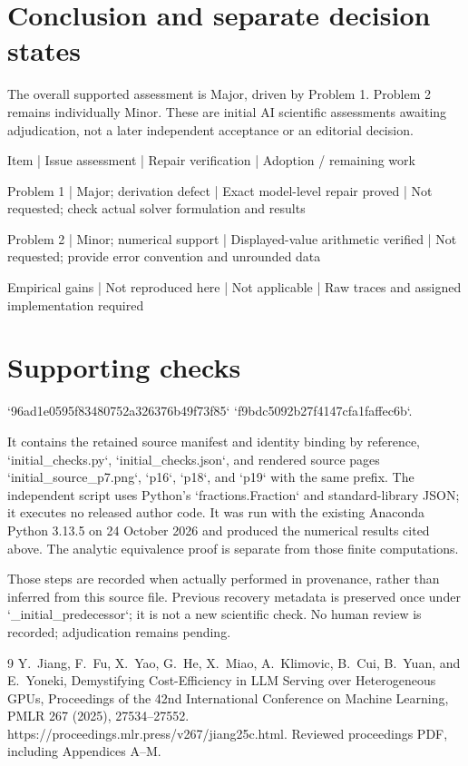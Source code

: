 \documentclass[10pt]{article}
\begin{document}
\section*{Conclusion and separate decision states}
The overall supported assessment is Major, driven by Problem 1. Problem 2 remains individually Minor. These are initial AI scientific assessments awaiting adjudication, not a later independent acceptance or an editorial decision.\par
Item | Issue assessment | Repair verification | Adoption / remaining work\par
Problem 1 | Major; derivation defect | Exact model-level repair proved | Not requested; check actual solver formulation and results\par
Problem 2 | Minor; numerical support | Displayed-value arithmetic verified | Not requested; provide error convention and unrounded data\par
Empirical gains | Not reproduced here | Not applicable | Raw traces and assigned implementation required\par
\section*{Supporting checks}
`96ad1e0595f83480752a326376b49f73f85`
`f9bdc5092b27f4147cfa1faffec6b`.\par
It contains the retained source manifest and identity binding by reference, `initial\_checks.py`, `initial\_checks.json`, and rendered source pages `initial\_source\_p7.png`, `p16`, `p18`, and `p19` with the same prefix. The independent script uses Python’s `fractions.Fraction` and standard-library JSON; it executes no released author code. It was run with the existing Anaconda Python 3.13.5 on 24 October 2026 and produced the numerical results cited above. The analytic equivalence proof is separate from those finite computations.\par
Those steps are recorded when actually performed in provenance, rather than inferred from this source file. Previous recovery metadata is preserved once under `\_initial\_predecessor`; it is not a new scientific check. No human review is recorded; adjudication remains pending.\par
9 Y. Jiang, F. Fu, X. Yao, G. He, X. Miao, A. Klimovic, B. Cui, B. Yuan, and E. Yoneki, Demystifying Cost-Efficiency in LLM Serving over Heterogeneous GPUs, Proceedings of the 42nd International Conference on Machine Learning, PMLR 267 (2025), 27534–27552. https://proceedings.mlr.press/v267/jiang25c.html. Reviewed proceedings PDF, including Appendices A–M.\par
\end{document}
